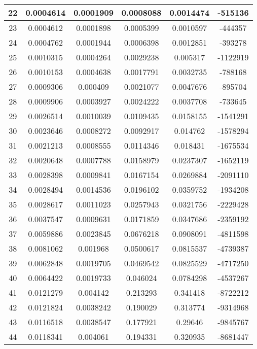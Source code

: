 \begin{longtable}{|c|c|c|c|c|c|}
22 & 0.0004614 & 0.0001909 & 0.0008088 & 0.0014474 & -515136    \\ \hline
23 & 0.0004612 & 0.0001898 & 0.0005399 & 0.0010597 & -444357    \\ \hline
24 & 0.0004762 & 0.0001944 & 0.0006398 & 0.0012851 & -393278    \\ \hline
25 & 0.0010315 & 0.0004264 & 0.0029238 & 0.005317  & -1122919   \\ \hline
26 & 0.0010153 & 0.0004638 & 0.0017791 & 0.0032735 & -788168    \\ \hline
27 & 0.0009306 & 0.000409  & 0.0021077 & 0.0047676 & -895704    \\ \hline
28 & 0.0009906 & 0.0003927 & 0.0024222 & 0.0037708 & -733645    \\ \hline
29 & 0.0026514 & 0.0010039 & 0.0109435 & 0.0158155 & -1541291   \\ \hline
30 & 0.0023646 & 0.0008272 & 0.0092917 & 0.014762  & -1578294   \\ \hline
31 & 0.0021213 & 0.0008555 & 0.0114346 & 0.018431  & -1675534   \\ \hline
32 & 0.0020648 & 0.0007788 & 0.0158979 & 0.0237307 & -1652119   \\ \hline
33 & 0.0028398 & 0.0009841 & 0.0167154 & 0.0269884 & -2091110   \\ \hline
34 & 0.0028494 & 0.0014536 & 0.0196102 & 0.0359752 & -1934208   \\ \hline
35 & 0.0028617 & 0.0011023 & 0.0257943 & 0.0321756 & -2229428   \\ \hline
36 & 0.0037547 & 0.0009631 & 0.0171859 & 0.0347686 & -2359192   \\ \hline
37 & 0.0059886 & 0.0023845 & 0.0676218 & 0.0908091 & -4811598   \\ \hline
38 & 0.0081062 & 0.001968  & 0.0500617 & 0.0815537 & -4739387   \\ \hline
39 & 0.0062848 & 0.0019705 & 0.0469542 & 0.0825529 & -4717250   \\ \hline
40 & 0.0064422 & 0.0019733 & 0.046024  & 0.0784298 & -4537267   \\ \hline
41 & 0.0121279 & 0.004142  & 0.213293  & 0.341418  & -8722212   \\ \hline
42 & 0.0121824 & 0.0038242 & 0.190029  & 0.313774  & -9314968   \\ \hline
43 & 0.0116518 & 0.0038547 & 0.177921  & 0.29646   & -9845767   \\ \hline
44 & 0.0118341 & 0.004061  & 0.194331  & 0.320935  & -8681447   \\ \hline

\end{longtable}
